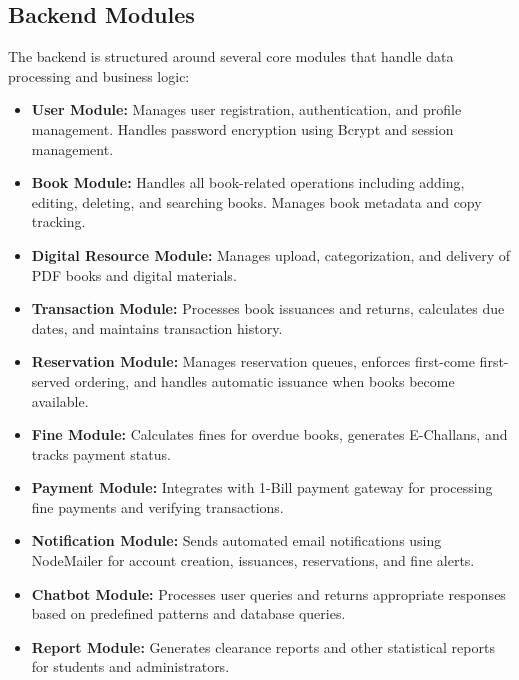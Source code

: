 \documentclass[12pt,a4paper]{report}
\begin{document}
\subsection{Backend Modules}

The backend is structured around several core modules that handle data processing and business logic:

\begin{itemize}
    \item \textbf{User Module:} Manages user registration, authentication, and profile management. Handles password encryption using Bcrypt and session management.
    
    \item \textbf{Book Module:} Handles all book-related operations including adding, editing, deleting, and searching books. Manages book metadata and copy tracking.
    
    \item \textbf{Digital Resource Module:} Manages upload, categorization, and delivery of PDF books and digital materials.
    
    \item \textbf{Transaction Module:} Processes book issuances and returns, calculates due dates, and maintains transaction history.
    
    \item \textbf{Reservation Module:} Manages reservation queues, enforces first-come first-served ordering, and handles automatic issuance when books become available.
    
    \item \textbf{Fine Module:} Calculates fines for overdue books, generates E-Challans, and tracks payment status.
    
    \item \textbf{Payment Module:} Integrates with 1-Bill payment gateway for processing fine payments and verifying transactions.
    
    \item \textbf{Notification Module:} Sends automated email notifications using NodeMailer for account creation, issuances, reservations, and fine alerts.
    
    \item \textbf{Chatbot Module:} Processes user queries and returns appropriate responses based on predefined patterns and database queries.
    
    \item \textbf{Report Module:} Generates clearance reports and other statistical reports for students and administrators.
\end{itemize}
\end{document}
